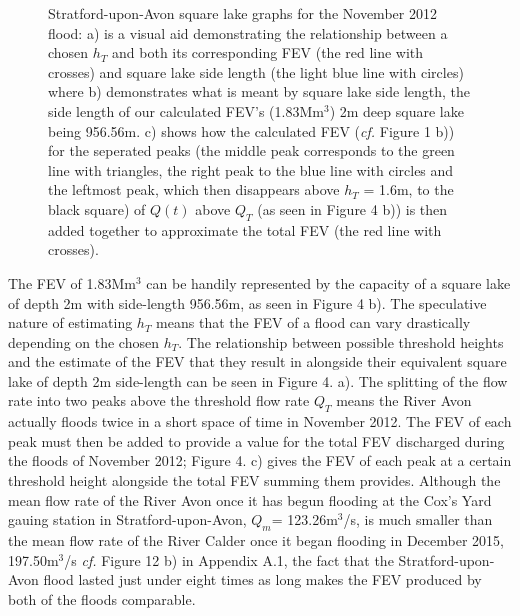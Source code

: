 \documentclass[11pt,a4paper]{article}
\begin{document}
\begin{figure}[ht!]
\centering
{}
\hfill
{}
\caption{Stratford-upon-Avon square lake graphs for the November 2012 flood: a) is a visual aid demonstrating the relationship between a chosen $h_T$ and both its corresponding FEV (the red line with crosses) and square lake side length (the light blue line with circles) where b) demonstrates what is meant by square lake side length, the side length of our calculated FEV's (1.83Mm$^3$) 2m deep square lake being 956.56m. c) shows how the calculated FEV (\textit{cf.} Figure 1 b)) for the seperated peaks (the middle peak corresponds to the green line with triangles, the right peak to the blue line with circles and the leftmost peak, which then disappears above $h_T$ = 1.6m, to the black square) of $Q(t)$ above $Q_T$ (as seen in Figure 4 b)) is then added together to approximate the total FEV (the red line with crosses).}
\end{figure}

The FEV of 1.83Mm$^3$ can be handily represented by the capacity of a square lake of depth 2m with side-length 956.56m, as seen in Figure 4 b). The speculative nature of estimating $h_T$ means that the FEV of a flood can vary drastically  depending on the chosen $h_T$. The relationship between possible threshold heights and the estimate of the FEV that they result in alongside their equivalent square lake of depth 2m side-length can be seen in Figure 4. a). The splitting of the flow rate into two peaks above the threshold flow rate $Q_T$ means the River Avon actually floods twice in a short space of time in November 2012. The FEV of each peak must then be added to provide a value for the total FEV discharged during the floods of November 2012{;} Figure 4. c) gives the FEV of each peak at a certain threshold height alongside the total FEV summing them provides. Although the mean flow rate of the River Avon once it has begun flooding at the Cox's Yard gauing station in Stratford-upon-Avon, $Q_m$= 123.26m$^3$/s, is much smaller than the mean flow rate of the River Calder once it began flooding in December 2015, 197.50m$^3$/s \textit{cf.} Figure 12 b) in Appendix A.1, the fact that the Stratford-upon-Avon flood lasted just under eight times as long makes the FEV produced by both of the floods comparable. 
\end{document}
